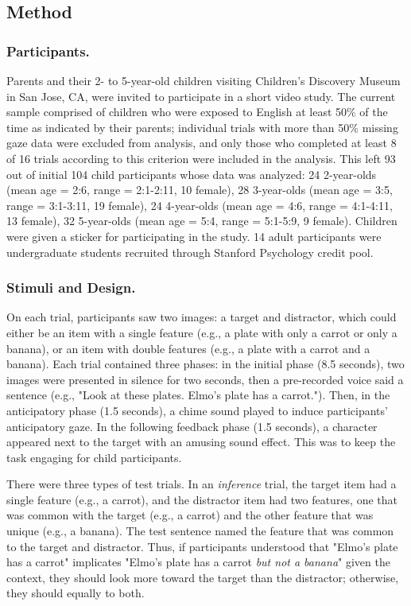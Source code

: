 \documentclass[10pt,letterpaper]{article}
\begin{document}
\subsection{Method}

\subsubsection{Participants.}

Parents and their 2- to 5-year-old children visiting Children's Discovery Museum in San Jose, CA, were invited to participate in a short video study. The current sample comprised of children who were exposed to English at least 50\% of the time as indicated by their parents; individual trials with more than 50\% missing gaze data were excluded from analysis, and only those who completed at least 8 of 16 trials according to this criterion were included in the analysis. This left 93 out of initial 104 child participants whose data was analyzed: 24 2-year-olds (mean age = 2:6, range = 2:1-2:11, 10 female), 28 3-year-olds (mean age = 3:5, range = 3:1-3:11, 19 female), 24 4-year-olds (mean age = 4:6, range = 4:1-4:11, 13 female), 32 5-year-olds (mean age = 5:4, range = 5:1-5:9, 9 female). Children were given a sticker for participating in the study. 14 adult participants were undergraduate students recruited through Stanford Psychology credit pool.

\vspace{12pt}

\subsubsection{Stimuli and Design.}

On each trial, participants saw two images: a target and distractor, which could either be an item with a single feature (e.g., a plate with only a carrot or only a banana), or an item with double features (e.g., a plate with a carrot and a banana). Each trial contained three phases: in the initial phase (8.5 seconds), two images were presented in silence for two seconds, then a pre-recorded voice said a sentence (e.g., "Look at these plates. Elmo's plate has a carrot."). Then, in the anticipatory phase (1.5 seconds), a chime sound played to induce participants' anticipatory gaze. In the following feedback phase (1.5 seconds), a character appeared next to the target with an amusing sound effect. This was to keep the task engaging for child participants.

There were three types of test trials. In an \emph{inference} trial, the target item had a single feature (e.g., a carrot), and the distractor item had two features, one that was common with the target (e.g., a carrot) and the other feature that was unique (e.g., a banana). The test sentence named the feature that was common to the target and distractor. Thus, if participants understood that "Elmo's plate has a carrot" implicates "Elmo's plate has a carrot \emph{but not a banana}" given the context, they should look more toward the target than the distractor; otherwise, they should equally to both.
\end{document}
